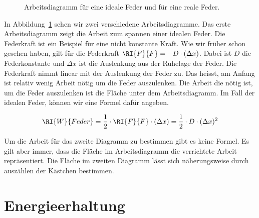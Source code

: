 \documentclass[12pt,a4paper,twoside]{article}
\def\dir{./Aufgaben_Mechanik/}
\newcommand{\Einbinden}[1]{}
\begin{document}
\begin{figure}[h!]
\begin{center}

\end{center}
\caption{\label{fig:arbeitsdiagramm} Arbeitsdiagramm für eine ideale Feder und für eine reale Feder.
}
\end{figure}

In Abbildung~\ref{fig:arbeitsdiagramm} sehen wir zwei verschiedene Arbeitsdiagramme. 
Das erste Arbeitsdiagramm zeigt die Arbeit zum spannen einer idealen Feder.
Die Federkraft ist ein Beispiel für eine nicht konstante Kraft. Wie wir früher schon
gesehen haben, gilt für die Federkraft $\RI{F}{F} = -D\cdot (\Delta x)$. Dabei ist $D$ die Federkonstante
und $\Delta x$ ist die Auslenkung aus der Ruhelage der Feder.
Die Federkraft nimmt linear mit der Auslenkung der Feder zu. Das heisst, am Anfang ist relativ wenig
Arbeit nötig um die Feder auszulenken. Die Arbeit die nötig ist, um die Feder auszulenken ist
die Fläche unter dem Arbeitsdiagramm. Im Fall der idealen Feder, können wir eine Formel dafür angeben.


\begin{eqnarray*}
	\RI{W}{Feder}= \frac{1}{2}\cdot\RI{F}{F}\cdot(\Delta x)=\frac{1}{2}\cdot D\cdot(\Delta x)^2
\end{eqnarray*}

Um die Arbeit für das zweite Diagramm zu bestimmen gibt es keine Formel. Es gilt aber immer, dass die Fläche
im Arbeitsdiagramm die verrichtete Arbeit repräsentiert. Die Fläche im zweiten Diagramm lässt sich näherungsweise
durch auszählen der Kästchen bestimmen.

%

\Einbinden{\dir/arbeit_feder01.tex}

\section*{Energieerhaltung}
\Einbinden{\dir/energieerhaltung_pendel.tex}
\Einbinden{\dir/energieerhaltung_bruecke.tex}
\Einbinden{\dir/energieerhaltung_feder.tex}
\Einbinden{\dir/energieerhaltung_wagen_feder.tex}
\end{document}
